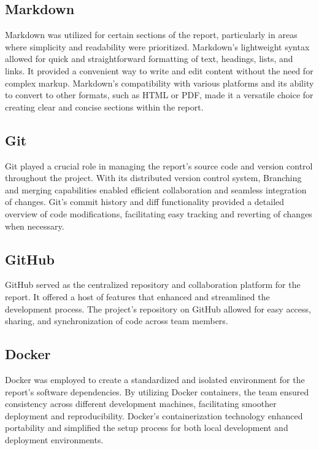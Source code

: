 \subsection*{Markdown}

Markdown was utilized for certain sections of the report, particularly in areas where simplicity and readability were prioritized. Markdown's lightweight syntax allowed for quick and straightforward formatting of text, headings, lists, and links. It provided a convenient way to write and edit content without the need for complex markup. Markdown's compatibility with various platforms and its ability to convert to other formats, such as HTML or PDF, made it a versatile choice for creating clear and concise sections within the report.

\vspace{1cm}

\subsection*{Git}

Git played a crucial role in managing the report's source code and version control throughout the project. With its distributed version control system, Branching and merging capabilities enabled efficient collaboration and seamless integration of changes. Git's commit history and diff functionality provided a detailed overview of code modifications, facilitating easy tracking and reverting of changes when necessary.

\vspace{1cm}

\subsection*{GitHub}

GitHub served as the centralized repository and collaboration platform for the report. It offered a host of features that enhanced and streamlined the development process. The project's repository on GitHub allowed for easy access, sharing, and synchronization of code across team members.

\vspace{1cm}

\subsection*{Docker}

Docker was employed to create a standardized and isolated environment for the report's software dependencies. By utilizing Docker containers, the team ensured consistency across different development machines, facilitating smoother deployment and reproducibility. Docker's containerization technology enhanced portability and simplified the setup process for both local development and deployment environments.

